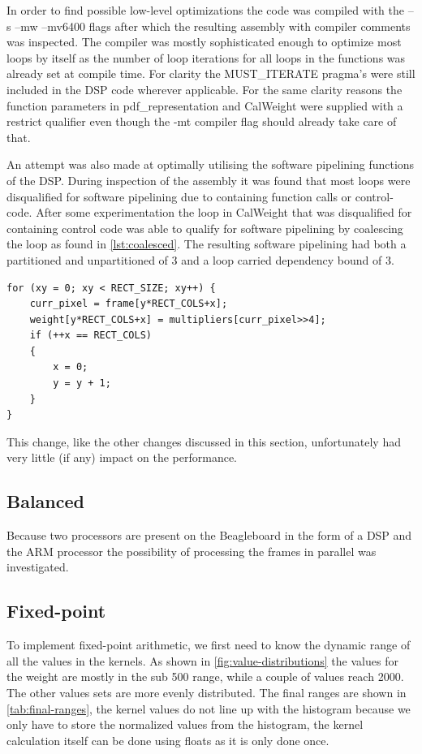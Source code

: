 \documentclass[final]{article}
\begin{document}
In order to find possible low-level optimizations the code was compiled with the –s –mw –mv6400 flags after which the resulting assembly with compiler comments was inspected. The compiler was mostly sophisticated enough to optimize most loops by itself as the number of loop iterations for all loops in the functions was already set at compile time. For clarity the MUST\_ITERATE pragma's were still included in the DSP code wherever applicable. For the same clarity reasons the function parameters in pdf\_representation and CalWeight were supplied with a restrict qualifier even though the -mt compiler flag should already take care of that.

An attempt was also made at optimally utilising the software pipelining functions of the DSP. During inspection of the assembly it was found that most loops were disqualified for software pipelining due to containing function calls or control-code. After some experimentation the loop in CalWeight that was disqualified for containing control code was able to qualify for software pipelining by coalescing the loop as found in \cref{lst:coalesced}. The resulting software pipelining had both a partitioned and unpartitioned of 3 and a loop carried dependency bound of 3. 
\begin{lstlisting}[style=c, caption=Coalesced loop for weight calculation, label=lst:coalesced]
for (xy = 0; xy < RECT_SIZE; xy++) {
    curr_pixel = frame[y*RECT_COLS+x];
    weight[y*RECT_COLS+x] = multipliers[curr_pixel>>4];
    if (++x == RECT_COLS)
    {
        x = 0;
        y = y + 1;
    }
}
\end{lstlisting} 
This change, like the other changes discussed in this section, unfortunately had very little (if any) impact on the performance.

\subsection{Balanced}
Because two processors are present on the Beagleboard in the form of a DSP and the ARM processor the possibility of processing the frames in parallel was investigated.

\subsection{Fixed-point}
To implement fixed-point arithmetic, we first need to know the dynamic range of all the values in the kernels.
As shown in \cref{fig:value-distributions} the values for the weight are mostly in the sub \num{500} range, while a couple of values reach \num{2000}.
The other values sets are more evenly distributed.
The final ranges are shown in \cref{tab:final-ranges}, the kernel values do not line up with the histogram because we only have to store the normalized values from the histogram, the kernel calculation itself can be done using floats as it is only done once.
\end{document}
